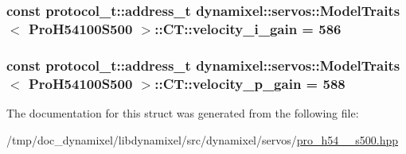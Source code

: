 \subsubsection[{velocity\+\_\+i\+\_\+gain}]{\setlength{\rightskip}{0pt plus 5cm}const {\bf protocol\+\_\+t\+::address\+\_\+t} {\bf dynamixel\+::servos\+::\+Model\+Traits}$<$ {\bf Pro\+H54100\+S500} $>$\+::C\+T\+::velocity\+\_\+i\+\_\+gain = 586\hspace{0.3cm}{\ttfamily [static]}}\label{structdynamixel_1_1servos_1_1_model_traits_3_01_pro_h54100_s500_01_4_1_1_c_t_aa9f95ecabd3a6e81786d55cd5fc6d01d}
\hypertarget{structdynamixel_1_1servos_1_1_model_traits_3_01_pro_h54100_s500_01_4_1_1_c_t_a8cf1be6d7590af17d609b4df627a620d}{}
\subsubsection[{velocity\+\_\+p\+\_\+gain}]{\setlength{\rightskip}{0pt plus 5cm}const {\bf protocol\+\_\+t\+::address\+\_\+t} {\bf dynamixel\+::servos\+::\+Model\+Traits}$<$ {\bf Pro\+H54100\+S500} $>$\+::C\+T\+::velocity\+\_\+p\+\_\+gain = 588\hspace{0.3cm}{\ttfamily [static]}}\label{structdynamixel_1_1servos_1_1_model_traits_3_01_pro_h54100_s500_01_4_1_1_c_t_a8cf1be6d7590af17d609b4df627a620d}


The documentation for this struct was generated from the following file\+:\begin{DoxyCompactItemize}
\item 
/tmp/doc\+\_\+dynamixel/libdynamixel/src/dynamixel/servos/\hyperlink{pro__h54__100__s500_8hpp}{pro\+\_\+h54\+\_\+\_\+s500.\+hpp}\end{DoxyCompactItemize}
